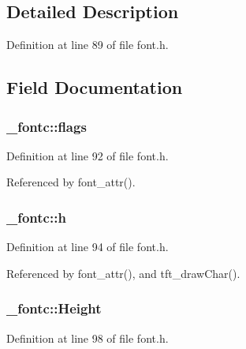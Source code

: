 \subsection{Detailed Description}


Definition at line 89 of file font.\+h.



\subsection{Field Documentation}
\subsubsection[{\texorpdfstring{flags}{flags}}]{ \+\_\+fontc\+::flags}\hypertarget{struct__fontc_aa74d9a5513b529b5e444f283afea40ef}{}\label{struct__fontc_aa74d9a5513b529b5e444f283afea40ef}


Definition at line 92 of file font.\+h.



Referenced by font\+\_\+attr().

\subsubsection[{\texorpdfstring{h}{h}}]{ \+\_\+fontc\+::h}\hypertarget{struct__fontc_a9feb8c838dfc1d4eebb15c8e53981944}{}\label{struct__fontc_a9feb8c838dfc1d4eebb15c8e53981944}


Definition at line 94 of file font.\+h.



Referenced by font\+\_\+attr(), and tft\+\_\+draw\+Char().

\subsubsection[{\texorpdfstring{Height}{Height}}]{ \+\_\+fontc\+::\+Height}\hypertarget{struct__fontc_a98f97c237dfb1027c38813a17ef6dcd6}{}\label{struct__fontc_a98f97c237dfb1027c38813a17ef6dcd6}


Definition at line 98 of file font.\+h.



